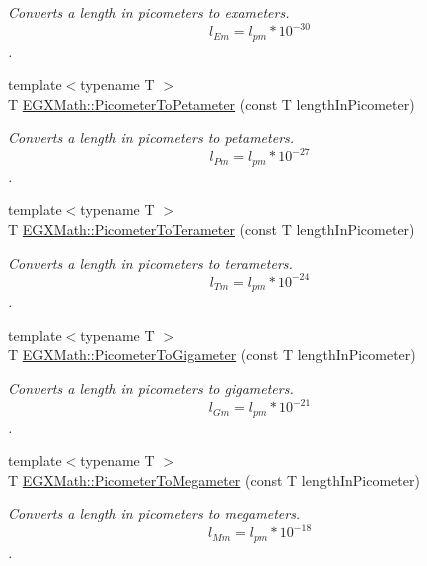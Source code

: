 \begin{DoxyCompactItemize}
\begin{DoxyCompactList}\small\item\em Converts a length in picometers to exameters. \[ l_{Em}=l_{pm} * 10^{-30} \]. \end{DoxyCompactList}\item 
{\footnotesize template$<$typename T $>$ }\\T \mbox{\hyperlink{group___e_g_x_math-_conversions-_length_conversions-_s_i-_picometer-_s_i_ga491c4ac277c5b63710e9d11aa4b1ecc4}{E\+G\+X\+Math\+::\+Picometer\+To\+Petameter}} (const T length\+In\+Picometer)
\begin{DoxyCompactList}\small\item\em Converts a length in picometers to petameters. \[ l_{Pm}=l_{pm} * 10^{-27} \]. \end{DoxyCompactList}\item 
{\footnotesize template$<$typename T $>$ }\\T \mbox{\hyperlink{group___e_g_x_math-_conversions-_length_conversions-_s_i-_picometer-_s_i_ga208383d9423614bbd8ddf3731114e31e}{E\+G\+X\+Math\+::\+Picometer\+To\+Terameter}} (const T length\+In\+Picometer)
\begin{DoxyCompactList}\small\item\em Converts a length in picometers to terameters. \[ l_{Tm}=l_{pm} * 10^{-24} \]. \end{DoxyCompactList}\item 
{\footnotesize template$<$typename T $>$ }\\T \mbox{\hyperlink{group___e_g_x_math-_conversions-_length_conversions-_s_i-_picometer-_s_i_ga9dbf38a2c9eb2f88b4e5061861ec42de}{E\+G\+X\+Math\+::\+Picometer\+To\+Gigameter}} (const T length\+In\+Picometer)
\begin{DoxyCompactList}\small\item\em Converts a length in picometers to gigameters. \[ l_{Gm}=l_{pm} * 10^{-21} \]. \end{DoxyCompactList}\item 
{\footnotesize template$<$typename T $>$ }\\T \mbox{\hyperlink{group___e_g_x_math-_conversions-_length_conversions-_s_i-_picometer-_s_i_gacf6647b0c2ac985376601d5095fa1624}{E\+G\+X\+Math\+::\+Picometer\+To\+Megameter}} (const T length\+In\+Picometer)
\begin{DoxyCompactList}\small\item\em Converts a length in picometers to megameters. \[ l_{Mm}=l_{pm} * 10^{-18} \]. \end{DoxyCompactList}\item 

\end{DoxyCompactItemize}
